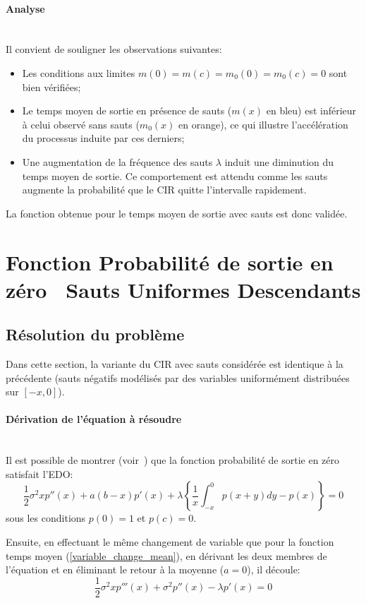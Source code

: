 \FloatBarrier\paragraph{Analyse}\phantom{}\\
Il convient de souligner les observations suivantes:
\begin{itemize}
    \item Les conditions aux limites \( m(0) = m(c) = m_0(0) = m_0(c) = 0 \) sont bien vérifiées;
    \item Le temps moyen de sortie en présence de sauts ($m(x)$ en bleu) est inférieur à celui observé sans sauts ($m_0(x)$ en orange), ce qui illustre l'accélération du processus induite par ces derniers;
    \item Une augmentation de la fréquence des sauts $\lambda$ induit une diminution du temps moyen de sortie. Ce comportement est attendu comme les sauts augmente la probabilité que le \acs{CIR} quitte l'intervalle rapidement.
\end{itemize}
La fonction obtenue pour le temps moyen de sortie avec sauts est donc validée.

\section{Fonction Probabilité de sortie en zéro \textemdash~Sauts Uniformes Descendants}\label{subsection_probability_jumps}
\subsection{Résolution du problème}
Dans cette section, la variante du \ac{CIR} avec sauts considérée est identique à la précédente (sauts négatifs modélisés par des variables uniformément distribuées sur $[-x,0]$).

\paragraph{Dérivation de l'équation à résoudre}\phantom{}\\
Il est possible de montrer (voir~\cite{lefebvre2007}) que la fonction probabilité de sortie en zéro satisfait l'\acs{EDO}:
\begin{equation}\label{probability_ide}
    \frac{1}{2}\sigma^2xp''(x)+a(b-x)p'(x)+\lambda\left\{\frac{1}{x}\int_{-x}^0p(x+y)dy-p(x)\right\}=0
\end{equation}
sous les conditions $p(0)=1$ et $p(c)=0$.

Ensuite, en effectuant le même changement de variable que pour la fonction temps moyen (\ref{variable_change_mean}), en dérivant les deux membres de l'équation et en éliminant le retour à la moyenne ($a=0$), il découle:
\begin{equation}\label{probability_3rd_order}
    \frac{1}{2}\sigma^2xp'''(x)+\sigma^2p''(x)-\lambda p'(x)=0
\end{equation}
